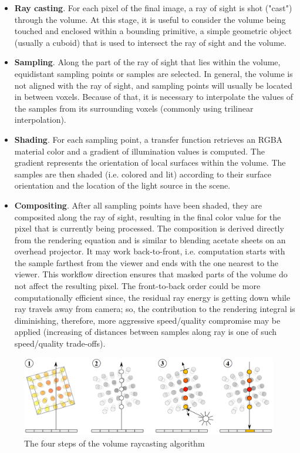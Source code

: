 \begin{itemize}

\item \textbf{Ray casting}. For each pixel of the final image, a ray of sight is shot ("cast") through the volume. At this stage, it is useful to consider the volume being touched and enclosed within a bounding primitive, a simple geometric object (usually a cuboid) that is used to intersect the ray of sight and the volume.

\item \textbf{Sampling}. Along the part of the ray of sight that lies within the volume, equidistant sampling points or samples are selected. In general, the volume is not aligned with the ray of sight, and sampling points will usually be located in between voxels. Because of that, it is necessary to interpolate the values of the samples from its surrounding voxels (commonly using trilinear interpolation).

\item \textbf{Shading}. For each sampling point, a transfer function retrieves an RGBA material color and a gradient of illumination values is computed. The gradient represents the orientation of local surfaces within the volume. The samples are then shaded (i.e. colored and lit) according to their surface orientation and the location of the light source in the scene.

\item \textbf{Compositing}. After all sampling points have been shaded, they are composited along the ray of sight, resulting in the final color value for the pixel that is currently being processed. The composition is derived directly from the rendering equation and is similar to blending acetate sheets on an overhead projector. It may work back-to-front, i.e. computation starts with the sample farthest from the viewer and ends with the one nearest to the viewer. This workflow direction ensures that masked parts of the volume do not affect the resulting pixel. The front-to-back order could be more computationally efficient since, the residual ray energy is getting down while ray travels away from camera; so, the contribution to the rendering integral is diminishing, therefore, more aggressive speed/quality compromise may be applied (increasing of distances between samples along ray is one of such speed/quality trade-offs).

\end{itemize}

\begin{figure}[th]
\centering
\includegraphics[width=\textwidth]{Figures/raycasting}
\decoRule
\caption[Volume raycasting]{ The four steps of the volume raycasting algorithm  }
\label{fig:rayasting}
\end{figure}

